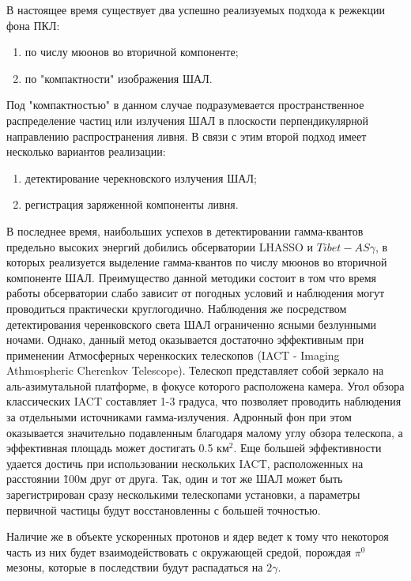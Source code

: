 В настоящее время существует два успешно реализуемых подхода к режекции фона ПКЛ:
\begin{enumerate}[beginpenalty=10000] %
	\item  по числу мюонов во вторичной компоненте;
	\item  по "компактности" изображения ШАЛ.
\end{enumerate}
Под "компактностью" в данном случае подразумевается пространственное распределение частиц или излучения ШАЛ в плоскости перпендикулярной направлению распространения ливня. В связи с этим второй подход имеет несколько вариантов реализации:
\begin{enumerate}[beginpenalty=10000] %
	\item  детектирование черекновского излучения ШАЛ;
	\item  регистрация заряженной компоненты ливня.
\end{enumerate}
В последнее время, наибольших успехов в детектировании гамма-квантов предельно высоких энергий добились обсерватории LHASSO и $Tibet-AS\gamma$, в которых реализуется выделение гамма-квантов по числу мюонов во вторичной компоненте ШАЛ. Преимущество данной методики состоит в том что время работы обсерватории слабо зависит от погодных условий и наблюдения могут проводиться практически круглогодично. Наблюдения же посредством детектирования черенковского света ШАЛ ограниченно ясными безлунными ночами. Однако, данный метод оказывается достаточно эффективным при применении Атмосферных черенкоских телескопов (IACT - Imaging Athmospheric Cherenkov Telescope). Телескоп представляет собой зеркало на аль-азимутальной платформе, в фокусе которого расположена камера. Угол обзора классических IACT составляет 1-3 градуса, что позволяет проводить наблюдения за отдельными источниками гамма-излучения. Адронный фон при этом оказывается значительно подавленным благодаря малому углу обзора телескопа, а эффективная площадь может достигать 0.5 $\text{км}^2$\cite{ASTRI2013}. Еще большей эффективности удается достичь при использовании нескольких IACT, расположенных на расстоянии \~100м друг от друга. Так, один и тот же ШАЛ может быть зарегистрирован сразу несколькими телескопами установки, а параметры первичной частицы будут восстановленны с большей точностью.


Наличие же в объекте ускоренных протонов и ядер ведет к тому что некотороя часть из них будет взаимодействовать с окружающей средой, порождая  $\pi^\text{0}$ мезоны, которые в последствии будут распадаться на $2\gamma$.

